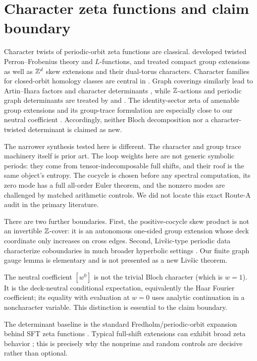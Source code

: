 \section{Character zeta functions and claim boundary}

Character twists of periodic-orbit zeta functions are classical.
\citet{adachisunada1987} developed twisted Perron--Frobenius theory and
$L$-functions, and \citet[Chs.~8 and 12]{parrypollicott1990} treated compact
group extensions as well as $\mathbb Z^d$ skew extensions and their dual-torus
characters.  Character families for closed-orbit homology classes
are central in \citet{katsudasunada1990}.  Graph coverings similarly lead to
Artin--Ihara factors and character determinants
\citep{starkterras1996}, while $\mathbb Z$-actions and periodic graph determinants
are treated by \citet{clair2009} and \citet{guidoisolalapidus2008}.  The
identity-sector zeta of amenable group extensions and its group-trace
formulation are especially close to our neutral coefficient
\citep{sharp2020}.
Accordingly, neither Bloch decomposition nor a character-twisted determinant
is claimed as new.

The narrower synthesis tested here is different.  The character and group
trace machinery itself is prior art.  The loop weights here are not
generic symbolic periods: they come from tensor-indecomposable full shifts,
and their roof is the same object's entropy.  The cocycle is chosen before
any spectral computation, its zero mode has a full all-order Euler theorem,
and the nonzero modes are challenged by matched arithmetic controls.  We did
not locate this exact Route-A audit in the primary literature.

There are two further boundaries.  First, the positive-cocycle skew product
is not an invertible $\mathbb Z$-cover: it is an autonomous one-sided group extension
whose deck coordinate only increases on cross edges.  Second, Liv\v{s}ic-type
periodic data characterize coboundaries in much broader hyperbolic settings
\citep{kalinin2011}.  Our finite graph gauge lemma is elementary and is not
presented as a new Liv\v{s}ic theorem.

The neutral coefficient $[w^0]$ is not the trivial Bloch character (which is
$w=1$).  It is the deck-neutral conditional expectation, equivalently the
Haar Fourier coefficient; its equality with evaluation at $w=0$ uses analytic
continuation in a noncharacter variable.  This distinction is essential to
the claim boundary.

The determinant baseline is the standard Fredholm/periodic-orbit expansion
behind SFT zeta functions \citep{bowenlanford1970}.  Typical full-shift
extensions can exhibit broad zeta behavior \citep{ward1999}; this is precisely
why the nonprime and random controls are decisive rather than optional.

